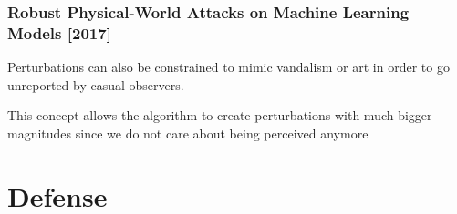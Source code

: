 \documentclass[9pt]{beamer}
\begin{document}
\begin{frame}
  \frametitle{Robust Physical-World Attacks on Machine Learning Models [2017]}

  Perturbations can also be constrained to mimic vandalism or art in
  order to go unreported by casual observers.

  \bigskip

  This concept allows the algorithm to create perturbations with much
  bigger magnitudes since we do not care about being perceived anymore

  \begin{center}
  \end{center}
\end{frame}

\section{Defense}

\end{document}
